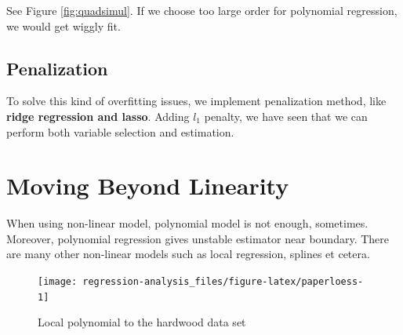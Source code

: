 \documentclass[]{book}
\newenvironment{Shaded}{\begin{snugshade}}{\end{snugshade}}
\newcommand{\DataTypeTok}[1]{\textcolor[rgb]{0.13,0.29,0.53}{#1}}
\newcommand{\KeywordTok}[1]{\textcolor[rgb]{0.13,0.29,0.53}{\textbf{#1}}}
\newcommand{\NormalTok}[1]{#1}
\newcommand{\OperatorTok}[1]{\textcolor[rgb]{0.81,0.36,0.00}{\textbf{#1}}}
\newcommand{\StringTok}[1]{\textcolor[rgb]{0.31,0.60,0.02}{#1}}
\theoremstyle{definition}
\theoremstyle{definition}
\theoremstyle{definition}
\theoremstyle{remark}
\begin{document}
See Figure \ref{fig:quadsimul}. If we choose too large order for polynomial regression, we would get wiggly fit.

\hypertarget{penalization}{%
\subsection{Penalization}\label{penalization}}

To solve this kind of overfitting issues, we implement penalization method, like \textbf{ridge regression and lasso}. Adding \(l_1\) penalty, we have seen that we can perform both variable selection and estimation.

\hypertarget{moving-beyond-linearity}{%
\section{Moving Beyond Linearity}\label{moving-beyond-linearity}}

When using non-linear model, polynomial model is not enough, sometimes. Moreover, polynomial regression gives unstable estimator near boundary. There are many other non-linear models such as local regression, splines et cetera.

\begin{Shaded}
\end{Shaded}

\begin{figure}[H]

{\centering \texttt{[image: regression-analysis\_files/figure-latex/paperloess-1]} 

}

\caption{Local polynomial to the hardwood data set}\label{fig:paperloess}
\end{figure}


\end{document}
